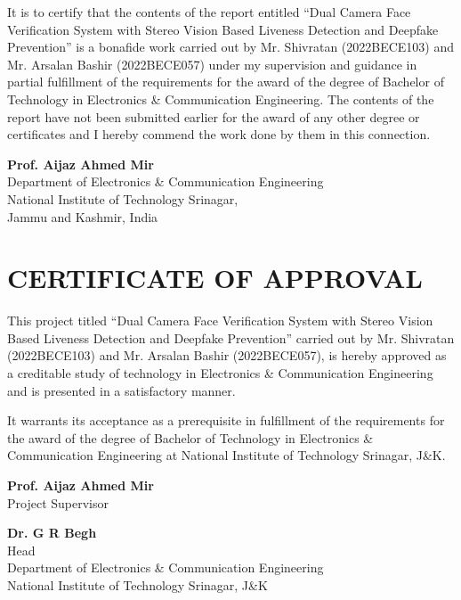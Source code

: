 \documentclass[12pt,a4paper]{report}
\begin{document}
It is to certify that the contents of the report entitled ``Dual Camera Face Verification System with Stereo Vision Based Liveness Detection and Deepfake Prevention'' is a bonafide work carried out by Mr. Shivratan (2022BECE103) and Mr. Arsalan Bashir (2022BECE057) under my supervision and guidance in partial fulfillment of the requirements for the award of the degree of Bachelor of Technology in Electronics \& Communication Engineering. The contents of the report have not been submitted earlier for the award of any other degree or certificates and I hereby commend the work done by them in this connection.

\vspace{3cm}
\begin{flushleft}
\textbf{Prof. Aijaz Ahmed Mir}\\
Department of Electronics \& Communication Engineering \\
National Institute of Technology Srinagar, \\
Jammu and Kashmir, India
\end{flushleft}

\newpage

\chapter*{CERTIFICATE OF APPROVAL}

This project titled ``Dual Camera Face Verification System with Stereo Vision Based Liveness Detection and Deepfake Prevention'' carried out by Mr. Shivratan (2022BECE103) and Mr. Arsalan Bashir (2022BECE057), is hereby approved as a creditable study of technology in Electronics \& Communication Engineering and is presented in a satisfactory manner.

It warrants its acceptance as a prerequisite in fulfillment of the requirements for the award of the degree of Bachelor of Technology in Electronics \& Communication Engineering at National Institute of Technology Srinagar, J\&K.

\vspace{3cm}

\noindent
\begin{minipage}[t]{0.5\textwidth}
\textbf{Prof. Aijaz Ahmed Mir} \\
Project Supervisor
\end{minipage}
\hfill
\begin{minipage}[t]{0.45\textwidth}
\textbf{Dr. G R Begh}\\
Head\\
Department of Electronics \& Communication Engineering\\
National Institute of Technology Srinagar, J\&K
\end{minipage}
\end{document}
